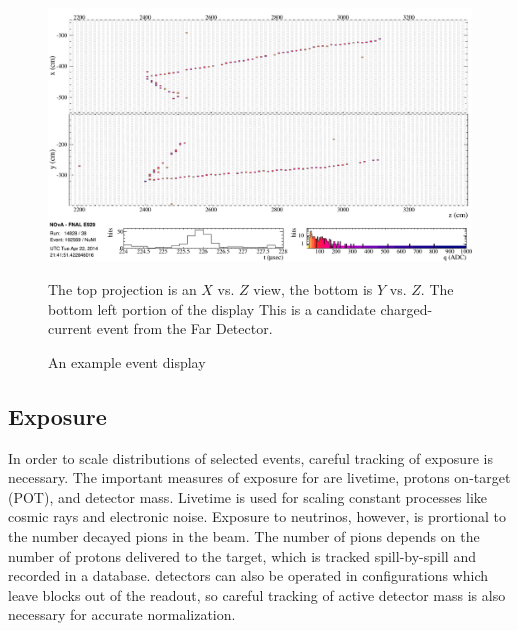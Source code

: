\begin{figure}
\begin{center}
\includegraphics[width=\textwidth]{figures/evd/evd_numu_cand.png}
\end{center}
\caption{An example \nova event display}{The top projection is an $X$ vs. $Z$
view, the bottom is $Y$ vs. $Z$.
The bottom left portion of the display
This is a candidate \numu charged-current event from the Far Detector.}
\label{eventDisplay}
\end{figure}


\subsection{Exposure}


In order to scale distributions of selected events, careful tracking
of exposure is necessary.
The important measures of exposure for \nova are livetime,
protons on-target (POT), and detector mass.
Livetime is used for scaling constant processes
like cosmic rays and electronic noise.
Exposure to neutrinos, however, is prortional to the number decayed pions
in the \numi beam.
The number of pions depends on the number of protons delivered to the target,
which is tracked spill-by-spill and recorded in a database.
\nova detectors can also be operated in configurations which leave blocks
out of the readout, so careful tracking of active detector mass is also
necessary for accurate normalization.



